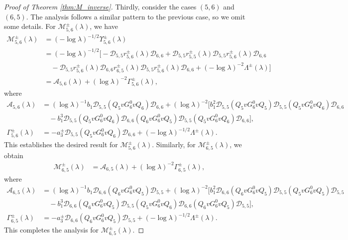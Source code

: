 \documentclass[reqno]{amsart}
\numberwithin{equation}{section}
\begin{document}
\begin{proof}[Proof of Theorem \ref{thm:M_inverse}]
	Thirdly, consider the cases $(5,6)$ and $(6,5).$ 
	The analysis follows a similar pattern to the previous case, so we omit some details.
	For $\mathcal{M}_{5,6}^{\pm}(\lambda)$, we have
	\begin{align*}
		\mathcal{M}_{5,6}^{\pm}(\lambda) &= (-\log \lambda)^{-1/2} \Upsilon_{5,6}^\pm(\lambda) \\
		&= (-\log \lambda)^{-1/2} \Big[ -\mathcal{D}_{5,5} r_{5,6}^{\pm}(\lambda) \mathcal{D}_{6,6} + \mathcal{D}_{5,5} r_{5,5}^{\pm}(\lambda) \mathcal{D}_{5,5} r_{5,6}^{\pm}(\lambda) \mathcal{D}_{6,6} \\ 
		&\quad - \mathcal{D}_{5,5} r_{5,6}^{\pm}(\lambda) \mathcal{D}_{6,6} r_{6,5}^{\pm}(\lambda) \mathcal{D}_{5,5} r_{5,6}^{\pm}(\lambda) \mathcal{D}_{6,6} + (-\log \lambda)^{-2} \Lambda^\pm(\lambda) \Big] \\
		&=  \mathcal{A}_{5,6}(\lambda) + (\log \lambda)^{-2} \Gamma_{5,6}^{\pm}(\lambda),
	\end{align*}
	where
	\begin{align}
		\mathcal{A}_{5,6}(\lambda) &=(\log \lambda)^{-1} b_1 \mathcal{D}_{5,5} (Q_5 v G_6^0 v Q_6) \mathcal{D}_{6,6} + (\log \lambda)^{-2} \Big[ b_1^2 \mathcal{D}_{5,5} (Q_5 v G_6^0 v Q_5) \mathcal{D}_{5,5} (Q_5 v G_6^0 v Q_6) \mathcal{D}_{6,6} \nonumber\\
		&\quad -b_1^3 \mathcal{D}_{5,5} (Q_5 v G_6^0 v Q_6) \mathcal{D}_{6,6} (Q_6 v G_6^0 v Q_5) \mathcal{D}_{5,5} (Q_5 v G_6^0 v Q_6) \mathcal{D}_{6,6} \Big], \nonumber\\
		\Gamma_{5,6}^{\pm}(\lambda) &= -a_3^\pm \mathcal{D}_{5,5} (Q_5 v G_6^0 v Q_6) \mathcal{D}_{6,6} + (-\log \lambda)^{-1/2} \Lambda^\pm(\lambda).\label{Gamma56}
	\end{align}
	This establishes the desired result for $\mathcal{M}_{5,6}^{\pm}(\lambda)$.
	Similarly, for $\mathcal{M}_{6,5}^{\pm}(\lambda)$, we obtain
	\begin{align*}
		\mathcal{M}_{6,5}^{\pm}(\lambda) &= \mathcal{A}_{6,5}(\lambda) + (\log \lambda)^{-2} \Gamma_{6,5}^{\pm}(\lambda),
	\end{align*}
	where
	\begin{align}
		\mathcal{A}_{6,5}(\lambda) &= (\log \lambda)^{-1}b_1 \mathcal{D}_{6,6} (Q_6 v G_6^0 v Q_5) \mathcal{D}_{5,5} + (\log \lambda)^{-2} \Big[ b_1^2 \mathcal{D}_{6,6} (Q_6 v G_6^0 v Q_5) \mathcal{D}_{5,5} (Q_5 v G_6^0 v Q_5) \mathcal{D}_{5,5} \nonumber\\
		&\quad -b_1^3 \mathcal{D}_{6,6} (Q_6 v G_6^0 v Q_5) \mathcal{D}_{5,5} (Q_5 v G_6^0 v Q_6) \mathcal{D}_{6,6} (Q_6 v G_6^0 v Q_5) \mathcal{D}_{5,5} \Big],\nonumber \\
		\Gamma_{6,5}^{\pm}(\lambda) &= -a_3^\pm \mathcal{D}_{6,6} (Q_6 v G_6^0 v Q_5) \mathcal{D}_{5,5} + (-\log \lambda)^{-1/2} \Lambda^\pm(\lambda).\label{Gamma65}
	\end{align}
	This completes the analysis for $\mathcal{M}_{6,5}^{\pm}(\lambda)$.
	

\end{proof}
\end{document}
